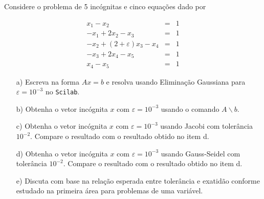 \begin{Exercise} Considere o problema de 5 incógnitas e cinco equações dado por

\begin{eqnarray*}
x_1-x_2&=&1\\
-x_{1}+2x_2-x_{3}&=&1\\
-x_{2}+(2+\varepsilon) x_3-x_{4}&=&1\\
-x_{3}+2x_4-x_{5}&=&1\\
x_{4}-x_{5}&=&1
\end{eqnarray*}
\begin{itemize}
\item[a)]  Escreva na forma $Ax=b$ e resolva usando Eliminação Gaussiana para $\varepsilon=10^{-3}$ no \verb+Scilab+.
\item[b)]  Obtenha o vetor incógnita $x$ com $\varepsilon=10^{-3}$ usando o comando $A\backslash b$.
\item[c)]  Obtenha o vetor incógnita $x$ com $\varepsilon=10^{-3}$ usando Jacobi com tolerância $10^{-2}$. Compare o resultado com o resultado obtido no item d.
\item[d)]  Obtenha o vetor incógnita $x$ com $\varepsilon=10^{-3}$ usando Gauss-Seidel com tolerância $10^{-2}$. Compare o resultado com o resultado obtido no item d.
\item[e)]  Discuta com base na relação esperada entre tolerância e exatidão conforme estudado na primeira área para problemas de uma variável.
\end{itemize}

\end{Exercise}

